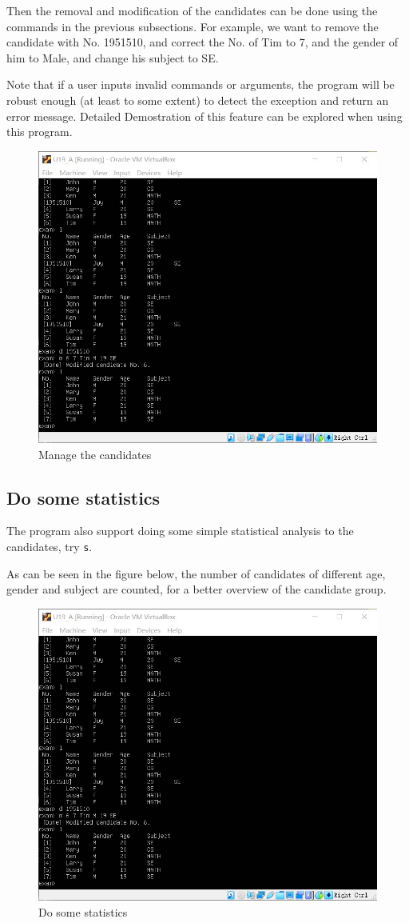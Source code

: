 \documentclass[cn,black,12pt,normal]{elegantnote}
\begin{document}
Then the removal and modification of the candidates can be done using the commands in the previous subsections. For example, we want to remove the candidate with No. 1951510, and correct the No. of Tim to 7, and the gender of him to Male, and change his subject to SE.

Note that if a user inputs invalid commands or arguments, the program will be robust enough (at least to some extent) to detect the exception and return an error message. Detailed Demostration of this feature can be explored when using this program.

\begin{figure}[H]
    \centering
    \includegraphics[width=0.7\linewidth]{image/exam_04.jpg}
    \caption{Manage the candidates}
\end{figure}

\subsection{Do some statistics}

The program also support doing some simple statistical analysis to the candidates, try \lstinline{s}.

As can be seen in the figure below, the number of candidates of different age, gender and subject are counted, for a better overview of the candidate group.

\begin{figure}[H]
    \centering
    \includegraphics[width=0.7\linewidth]{image/exam_05.jpg}
    \caption{Do some statistics}
\end{figure}
\end{document}
